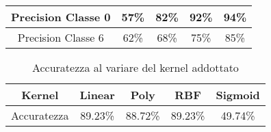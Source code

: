 \documentclass[12pt]{IEEEtran}
\begin{document}
\begin{itemize}
\begin{table}[h]
\begin{adjustbox}{width=\columnwidth}
\begin{tabular}{|c|c|c|c|c|}
        Precision Classe 0 &57\%    &82\%    &92\%     &94\%       \\ \hline
        Precision Classe 6 &62\%    &68\%    &75\%     &85\%       \\ \hline
        \end{tabular}
        \end{adjustbox}
        \end{table} 
        \begin{table}[h!]
        \caption {Accuratezza al variare del kernel addottato}
        \begin{adjustbox}{width=\columnwidth}
        \begin{tabular}{|c|c|c|c|c|}
        \hline
        Kernel      & Linear  & Poly    & RBF     & Sigmoid \\ \hline
        Accuratezza & 89.23\% & 88.72\% & 89.23\% & 49.74\% \\ \hline
        \end{tabular}
        \end{adjustbox}
        \end{table}
        
    \end{itemize}
\newpage
\end{document}
